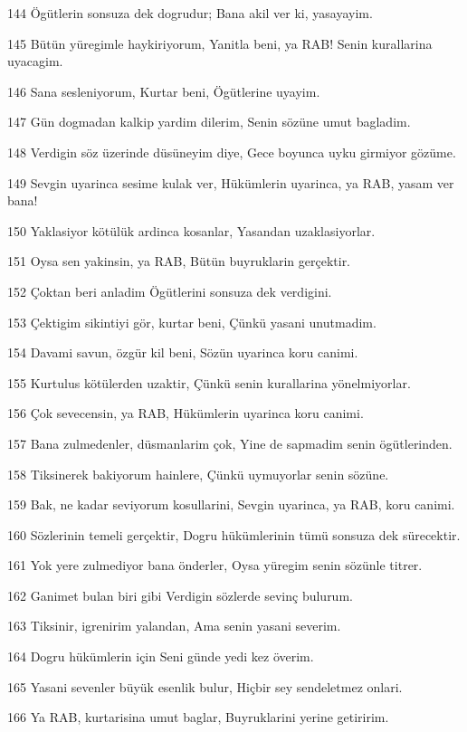 \par 144 Ögütlerin sonsuza dek dogrudur; Bana akil ver ki, yasayayim.
\par 145 Bütün yüregimle haykiriyorum, Yanitla beni, ya RAB! Senin kurallarina uyacagim.
\par 146 Sana sesleniyorum, Kurtar beni, Ögütlerine uyayim.
\par 147 Gün dogmadan kalkip yardim dilerim, Senin sözüne umut bagladim.
\par 148 Verdigin söz üzerinde düsüneyim diye, Gece boyunca uyku girmiyor gözüme.
\par 149 Sevgin uyarinca sesime kulak ver, Hükümlerin uyarinca, ya RAB, yasam ver bana!
\par 150 Yaklasiyor kötülük ardinca kosanlar, Yasandan uzaklasiyorlar.
\par 151 Oysa sen yakinsin, ya RAB, Bütün buyruklarin gerçektir.
\par 152 Çoktan beri anladim Ögütlerini sonsuza dek verdigini.
\par 153 Çektigim sikintiyi gör, kurtar beni, Çünkü yasani unutmadim.
\par 154 Davami savun, özgür kil beni, Sözün uyarinca koru canimi.
\par 155 Kurtulus kötülerden uzaktir, Çünkü senin kurallarina yönelmiyorlar.
\par 156 Çok sevecensin, ya RAB, Hükümlerin uyarinca koru canimi.
\par 157 Bana zulmedenler, düsmanlarim çok, Yine de sapmadim senin ögütlerinden.
\par 158 Tiksinerek bakiyorum hainlere, Çünkü uymuyorlar senin sözüne.
\par 159 Bak, ne kadar seviyorum kosullarini, Sevgin uyarinca, ya RAB, koru canimi.
\par 160 Sözlerinin temeli gerçektir, Dogru hükümlerinin tümü sonsuza dek sürecektir.
\par 161 Yok yere zulmediyor bana önderler, Oysa yüregim senin sözünle titrer.
\par 162 Ganimet bulan biri gibi Verdigin sözlerde sevinç bulurum.
\par 163 Tiksinir, igrenirim yalandan, Ama senin yasani severim.
\par 164 Dogru hükümlerin için Seni günde yedi kez överim.
\par 165 Yasani sevenler büyük esenlik bulur, Hiçbir sey sendeletmez onlari.
\par 166 Ya RAB, kurtarisina umut baglar, Buyruklarini yerine getiririm.
